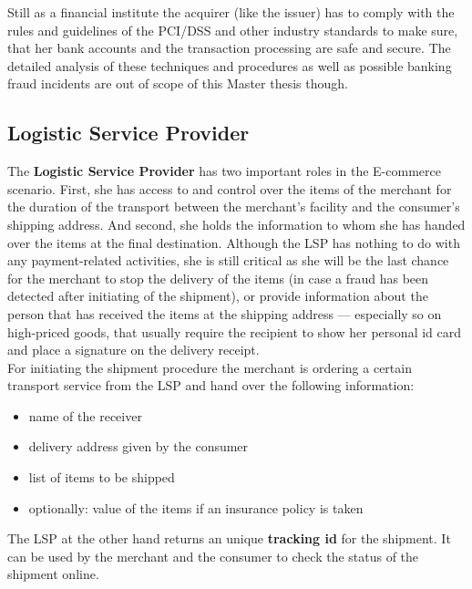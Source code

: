 Still as a financial institute the acquirer (like the issuer) has to comply with the rules and guidelines of the PCI/DSS and other industry standards to make sure, that her bank accounts and the transaction processing are safe and secure. The detailed analysis of these techniques and procedures as well as possible banking fraud incidents are out of scope of this Master thesis though.


\subsection{Logistic Service Provider}
\label{subsec:stakeholder_lsp}

The \textbf{Logistic Service Provider} has two important roles in the E-commerce scenario. First, she has access to and control over the items of the merchant for the duration of the transport between the merchant's facility and the consumer's shipping address. And second, she holds the information to whom she has handed over the items at the final destination. Although the \gls{LSP} has nothing to do with any payment-related activities, she is still critical as she will be the last chance for the merchant to stop the delivery of the items (in case a fraud has been detected after initiating of the shipment), or provide information about the person that has received the items at the shipping address --- especially so on high-priced goods, that usually require the recipient to show her personal id card and place a signature on the delivery receipt. \\

For initiating the shipment procedure the merchant is ordering a certain transport service from the \gls{LSP} and hand over the following information:\@

\begin{itemize}
	\item name of the receiver
	\item delivery address given by the consumer
	\item list of items to be shipped
	\item optionally: value of the items if an insurance policy is taken
\end{itemize}

The \gls{LSP} at the other hand returns an unique \textbf{tracking id} for the shipment. It can be used by the merchant and the consumer to check the status of the shipment online. \\

